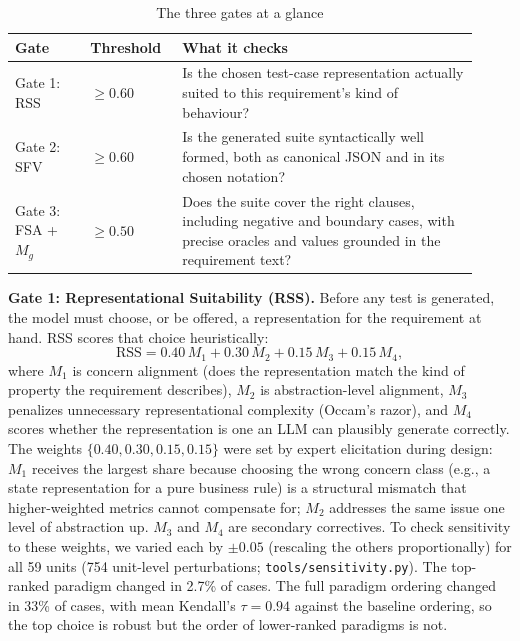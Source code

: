 \documentclass[conference]{IEEEtran}
\begin{document}
  \begin{table}[t]
  \centering
  \caption{The three gates at a glance}
  \label{tab:gates}
  \small
  \begin{tabular}{@{}p{0.15\linewidth}p{0.18\linewidth}p{0.59\linewidth}@{}}
  \toprule
  \textbf{Gate} & \textbf{Threshold} & \textbf{What it checks} \\
  \midrule
  Gate 1: RSS & $\geq 0.60$ & Is the chosen test-case representation actually suited to this requirement's kind of behaviour? \\
  Gate 2: SFV & $\geq 0.60$ & Is the generated suite syntactically well formed, both as canonical JSON and in its chosen notation? \\
  Gate 3: FSA + $M_g$ & $\geq 0.50$ & Does the suite cover the right clauses, including negative and boundary cases, with precise oracles and values grounded in the requirement text? \\
  \bottomrule
  \end{tabular}
  \end{table}

  \textbf{Gate 1: Representational Suitability (RSS).} Before any test is
  generated, the model must choose, or be offered, a representation for the
  requirement at hand. RSS scores that choice heuristically:
  \begin{equation}
  \mathrm{RSS} = 0.40\,M_1 + 0.30\,M_2 + 0.15\,M_3 + 0.15\,M_4,
  \end{equation}
  where $M_1$ is concern alignment (does the representation match the kind of
  property the requirement describes), $M_2$ is abstraction-level alignment,
  $M_3$ penalizes unnecessary representational complexity (Occam's razor), and
  $M_4$ scores whether the representation is one an LLM can plausibly generate
  correctly. The weights $\{0.40, 0.30, 0.15, 0.15\}$ were set by expert
  elicitation during design: $M_1$ receives the largest share because choosing
  the wrong concern class (e.g., a state representation for a pure business
  rule) is a structural mismatch that higher-weighted metrics cannot compensate
  for; $M_2$ addresses the same issue one level of abstraction up. $M_3$ and
  $M_4$ are secondary correctives. To check sensitivity to these weights, we varied each by
  $\pm0.05$ (rescaling the others proportionally) for all 59 units
  (754 unit-level perturbations; \texttt{tools/sensitivity.py}). The top-ranked
  paradigm changed in 2.7\% of cases. The full paradigm ordering changed in 33\%
  of cases, with mean Kendall's $\tau=0.94$ against the baseline ordering, so
  the top choice is robust but the order of lower-ranked paradigms is not.
\end{document}
